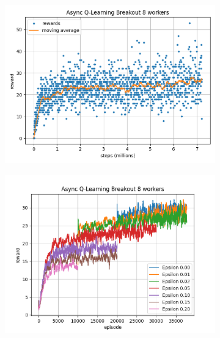 \documentclass{article}
\begin{document}
\begin{figure}[H]
\centering
\begin{subfigure}{0.49\textwidth}
\centering
\includegraphics[scale=0.4]{"async_q_learn_best_by_steps"}
\end{subfigure}
\begin{subfigure}{0.49\textwidth}
\centering
\includegraphics[scale=0.4]{"async_q_learn_best_epsilon_values"}
\end{subfigure}
\end{figure}
\end{document}

